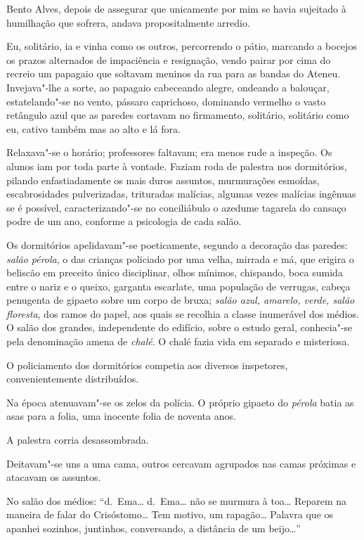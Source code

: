Bento Alves, depois de assegurar que unicamente por mim se havia
sujeitado à humilhação que sofrera, andava propositalmente arredio. 

Eu, solitário, ia e vinha como os outros, percorrendo o pátio, marcando a
bocejos os prazos alternados de impaciência e resignação, vendo pairar
por cima do recreio um papagaio que soltavam meninos da rua para as
bandas do Ateneu. Invejava"-lhe a sorte, ao papagaio cabeceando
alegre, ondeando a balouçar, estatelando"-se no vento, pássaro
caprichoso, dominando vermelho o vasto retângulo azul que as paredes
cortavam no firmamento, solitário, solitário como eu, cativo também mas
ao alto e lá fora. 

Relaxava"-se o horário; professores faltavam; era
menos rude a inspeção. Os alunos iam por toda parte à vontade. Faziam
roda de palestra nos dormitórios, pilando enfastiadamente os mais duros
assuntos, murmurações esmoídas, escabrosidades pulverizadas, trituradas
malícias, algumas vezes malícias ingênuas se é possível, caracterizando"-se no conciliábulo o
azedume tagarela do cansaço podre de um ano, conforme a psicologia de
cada salão. 

Os dormitórios apelidavam"-se poeticamente, segundo a
decoração das paredes: \textit{salão pérola}, o das crianças policiado por uma
velha, mirrada e má, que erigira o beliscão em preceito único
disciplinar, olhos mínimos, chispando, boca sumida entre o nariz e o
queixo, garganta escarlate, uma população de verrugas, cabeça penugenta
de gipaeto sobre um corpo de bruxa; \textit{salão azul, amarelo, verde, salão
floresta}, dos ramos do papel, aos quais se recolhia a classe inumerável
dos médios. O salão dos grandes, independente do edifício, sobre o
estudo geral, conhecia"-se pela denominação amena de \textit{chalé}. O chalé
fazia vida em separado e misteriosa. 

O policiamento dos dormitórios
competia aos diversos inspetores, convenientemente distribuídos. 

Na época atenuavam"-se os zelos da polícia. O próprio gipaeto do \textit{pérola}
batia as asas para a folia, uma inocente folia de noventa anos. 

A palestra corria desassombrada. 

Deitavam"-se uns a uma cama, outros
cercavam agrupados nas camas próximas e atacavam os assuntos. 

No salão dos médios: ``d.~Ema\ldots{} d.~Ema\ldots{} não se murmura à toa\ldots{} Reparem na
maneira de falar do Crisóstomo\ldots{} Tem motivo, um rapagão\ldots{} Palavra que
os apanhei sozinhos, juntinhos, conversando, a distância de um beijo\ldots{}''

